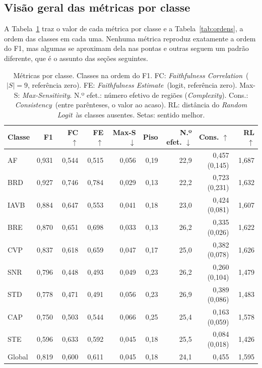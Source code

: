 \documentclass[11pt,a4paper]{article}
\newcommand{\fonte}[1]{\par\vspace{2pt}{\centering\footnotesize Fonte: #1\par}}
\newcommand{\FC}{\textit{Faithfulness Correlation}}
\newcommand{\FE}{\textit{Faithfulness Estimate}}
\newcommand{\MS}{\textit{Max-Sensitivity}}
\newcommand{\CX}{\textit{Complexity}}
\newcommand{\CS}{\textit{Consistency}}
\newcommand{\RL}{\textit{Random Logit}}
\begin{document}
\subsection{Visão geral das métricas por classe}\label{sec:res-visao}
A Tabela~\ref{tab:res} traz o valor de cada métrica por classe e a Tabela~\ref{tab:ordens}, a ordem das classes em cada uma. Nenhuma métrica reproduz exatamente a ordem do F1, mas algumas se aproximam dela nas pontas e outras seguem um padrão diferente, que é o assunto das seções seguintes.

\begin{table}[H]\centering\small
\caption{Métricas por classe. Classes na ordem do F1. FC: \FC\ ($|S| = 9$, referência zero). FE: \FE\ (logit, referência zero). Max-S: \MS. N.º efet.: número efetivo de regiões (\CX). Cons.: \CS\ (entre parênteses, o valor ao acaso). RL: distância do \RL\ às classes ausentes. Setas: sentido melhor.}\label{tab:res}
\setlength{\tabcolsep}{4pt}
\begin{tabular}{lrrrrrrrr}
\toprule
\textbf{Classe} & \textbf{F1} & \textbf{FC} $\uparrow$ & \textbf{FE} $\uparrow$ & \textbf{Max-S} $\downarrow$ & \textbf{Piso} & \textbf{N.º efet.} $\downarrow$ & \textbf{Cons.} $\uparrow$ & \textbf{RL} $\uparrow$ \\
\midrule
AF   & 0,931 & 0,544 & 0,515 & 0,056 & 0,19 & 22,9 & 0,457 (0,145) & 1,687 \\
BRD  & 0,927 & 0,746 & 0,784 & 0,029 & 0,13 & 22,2 & 0,723 (0,231) & 1,632 \\
IAVB & 0,884 & 0,647 & 0,553 & 0,041 & 0,18 & 23,0 & 0,424 (0,081) & 1,607 \\
BRE  & 0,870 & 0,651 & 0,698 & 0,033 & 0,13 & 26,2 & 0,335 (0,026) & 1,622 \\
CVP  & 0,837 & 0,618 & 0,659 & 0,047 & 0,17 & 25,0 & 0,382 (0,078) & 1,626 \\
SNR  & 0,796 & 0,448 & 0,493 & 0,049 & 0,23 & 26,2 & 0,260 (0,104) & 1,479 \\
STD  & 0,778 & 0,471 & 0,491 & 0,056 & 0,23 & 26,9 & 0,389 (0,086) & 1,483 \\
CAP  & 0,750 & 0,503 & 0,544 & 0,066 & 0,25 & 25,4 & 0,163 (0,059) & 1,578 \\
STE  & 0,596 & 0,633 & 0,592 & 0,045 & 0,18 & 25,5 & 0,084 (0,018) & 1,426 \\
\midrule
Global & 0,819 & 0,600 & 0,611 & 0,045 & 0,18 & 24,1 & 0,455 & 1,595 \\
\bottomrule
\end{tabular}
\fonte{Dados do presente estudo.}
\end{table}
\end{document}
